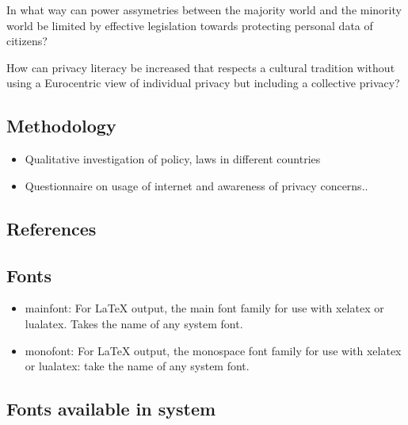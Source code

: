 \documentclass[
  letterpaper,
  DIV=11,
  numbers=noendperiod]{scrartcl}
\providecommand{\tightlist}{%
  \setlength{\itemsep}{0pt}\setlength{\parskip}{0pt}}
\begin{document}
In what way can power assymetries between the majority world and the
minority world be limited by effective legislation towards protecting
personal data of citizens?

How can privacy literacy be increased that respects a cultural tradition
without using a Eurocentric view of individual privacy but including a
collective privacy?

\subsection{Methodology}\label{methodology}

\begin{itemize}
\tightlist
\item
  Qualitative investigation of policy, laws in different countries
\item
  Questionnaire on usage of internet and awareness of privacy concerns..
\end{itemize}

\subsection{References}\label{references}

\subsection{Fonts}\label{fonts}

\begin{itemize}
\item
  mainfont: For LaTeX output, the main font family for use with xelatex
  or lualatex. Takes the name of any system font.
\item
  monofont: For LaTeX output, the monospace font family for use with
  xelatex or lualatex: take the name of any system font.
\end{itemize}

\subsection*{Fonts available in system}\label{fonts-available-in-system}
\end{document}

